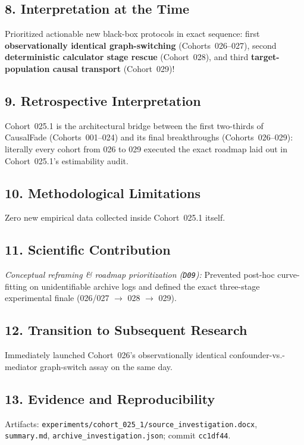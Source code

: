 \subsection*{8. Interpretation at the Time}
Prioritized actionable new black-box protocols in exact sequence: first \textbf{observationally identical graph-switching} (Cohorts~026--027), second \textbf{deterministic calculator stage rescue} (Cohort~028), and third \textbf{target-population causal transport} (Cohort~029)!

\subsection*{9. Retrospective Interpretation}
Cohort~025.1 is the architectural bridge between the first two-thirds of CausalFade (Cohorts~001--024) and its final breakthroughs (Cohorts~026--029): literally every cohort from 026 to 029 executed the exact roadmap laid out in Cohort~025.1's estimability audit.

\subsection*{10. Methodological Limitations}
Zero new empirical data collected inside Cohort~025.1 itself.

\subsection*{11. Scientific Contribution}
\emph{Conceptual reframing \& roadmap prioritization (\texttt{D09}):} Prevented post-hoc curve-fitting on unidentifiable archive logs and defined the exact three-stage experimental finale (026/027 $\to$ 028 $\to$ 029).

\subsection*{12. Transition to Subsequent Research}
Immediately launched Cohort~026's observationally identical confounder-vs.-mediator graph-switch assay on the same day.

\subsection*{13. Evidence and Reproducibility}
Artifacts: \texttt{experiments/cohort\_025\_1/source\_investigation.docx}, \texttt{summary.md}, \texttt{archive\_investigation.json}; commit \texttt{cc1df44}.
